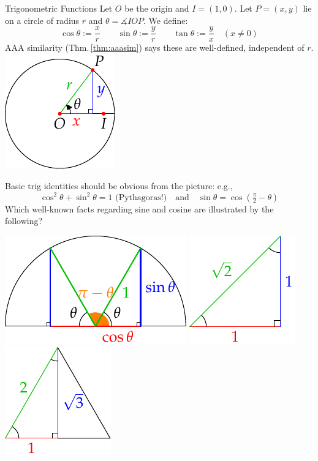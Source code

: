 \begin{defn}[lower separated=false, sidebyside, sidebyside align=top seam, sidebyside gap=0pt, righthand width=0.23\linewidth]{Trigonometric Functions}{}
	Let $O$ be the origin and $I=(1,0)$. Let $P=(x,y)$ lie on a circle of radius $r$ and $\theta=\measuredangle IOP$. We define:
	\[
		\cos\theta :=\frac xr\qquad \sin\theta:=\frac yr\qquad \tan\theta:=\frac yx\quad (x\neq 0)
	\]
	AAA similarity (Thm.\,\ref{thm:aaasim}) says these are well-defined, independent of $r$.
	\tcblower
	\flushright
	\includegraphics[scale=0.95]{angles-sine}
\end{defn}

\begin{example}{}{}
	Basic trig identities should be obvious from the picture: e.g.,
	\[
		\cos^2\theta+\sin^2\theta=1 \text{ (Pythagoras!)}
		\quad\text{and}\quad
		\sin\theta=\cos(\tfrac\pi 2-\theta)
	\]
	Which well-known facts regarding sine and cosine are illustrated by the following?
	\begin{center}
		\includegraphics[scale=0.95]{angles-trigbasic1}
		\qquad
		\includegraphics[scale=0.95]{angles-trigbasic2}
		\qquad
		\includegraphics[scale=0.95]{angles-trigbasic3}
	\end{center}
\end{example}


